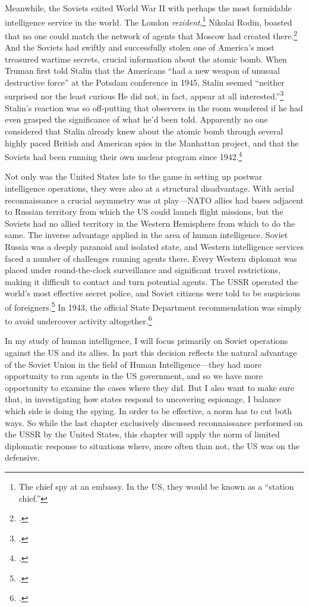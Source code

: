 \documentclass{report}
\begin{document}
\begin{refsegment}
Meanwhile, the Soviets exited World War II with perhaps the most formidable intelligence service in the world. The London \emph{rezident},\footnote{The chief spy at an embassy. In the US, they would be known as a ``station chief.''} Nikolai Rodin, boasted that no one could match the network of agents that Moscow had created there.\footcite[p.~151]{haslam_near_2015} And the Soviets had swiftly and successfully stolen one of America's most treasured wartime secrets, crucial information about the atomic bomb. When Truman first told Stalin that the Americans ``had a new weapon of unusual destructive force'' at the Potsdam conference in 1945, Stalin seemed ``neither surprised nor the least curious \textelp{} He did not, in fact, appear at all interested.''\footcite[p.~443]{mccullough_truman_1992}  Stalin's reaction was so off-putting that observers in the room wondered if he had even grasped the significance of what he'd been told. Apparently no one considered that Stalin already knew about the atomic bomb through several highly paced British and American spies in the Manhattan project, and that the Soviets had been running their own nuclear program since 1942.\footcite[p.~443]{mccullough_truman_1992}

Not only was the United States late to the game in setting up postwar intelligence operations, they were also at a structural disadvantage. With aerial reconnaissance a crucial asymmetry was at play---NATO allies had bases adjacent to Russian territory from which the US could launch flight missions, but the Soviets had no allied territory in the Western Hemisphere from which to do the same. The inverse advantage applied in the area of human intelligence. Soviet Russia was a deeply paranoid and isolated state, and Western intelligence services faced a number of challenges running agents there. Every Western diplomat was placed under round-the-clock surveillance and significant travel restrictions, making it difficult to contact and turn potential agents. The USSR operated the world's most effective secret police, and Soviet citizens were told to be suspicious of foreigners.\footcite[p.~42]{richelson_american_1987} In 1943, the official State Department recommendation was simply to avoid undercover activity altogether.\footcite[p.~44]{richelson_american_1987}

In my study of human intelligence, I will focus primarily on Soviet operations against the US and its allies. In part this decision reflects the natural advantage of the Soviet Union in the field of Human Intelligence---they had more opportunity to run agents in the US government, and so we have more opportunity to examine the cases where they did. But I also want to make sure that, in investigating how states respond to uncovering espionage, I balance which side is doing the spying. In order to be effective, a norm has to cut both ways. So while the last chapter exclusively discussed reconnaissance performed on the USSR by the United States, this chapter will apply the norm of limited diplomatic response to situations where, more often than not, the US was on the defensive.


\end{refsegment}
\end{document}

